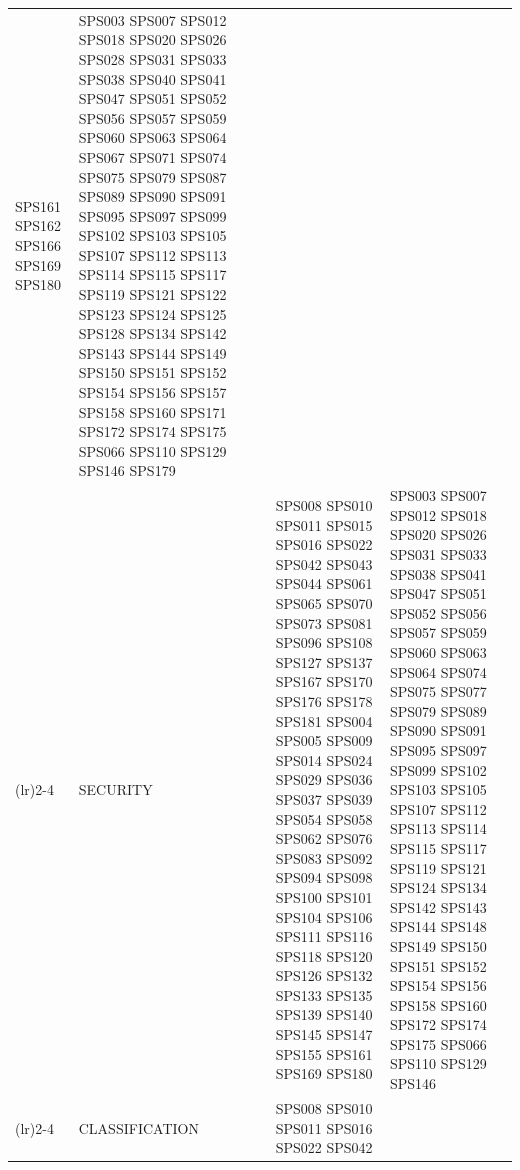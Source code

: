 \begin{table}[htbp]
\begin{tabularx}{\textwidth}{p{0.5cm}p{1.5cm}>{\raggedright\arraybackslash}X>{\raggedright\arraybackslash}X>{\raggedright\arraybackslash}X}
																		 SPS161 SPS162 SPS166 SPS169 SPS180         & SPS003 SPS007 SPS012 SPS018 SPS020 SPS026 
																													  SPS028 SPS031 SPS033 SPS038 SPS040 SPS041 
																													  SPS047 SPS051 SPS052 SPS056 SPS057 SPS059 
																													  SPS060 SPS063 SPS064 SPS067 SPS071 SPS074 
																													  SPS075 SPS079 SPS087 SPS089 SPS090 SPS091 
																													  SPS095 SPS097 SPS099 SPS102 SPS103 SPS105 
																													  SPS107 SPS112 SPS113 SPS114 SPS115 SPS117 
																													  SPS119 SPS121 SPS122 SPS123 SPS124 SPS125 
																													  SPS128 SPS134 SPS142 SPS143 SPS144 SPS149 
																													  SPS150 SPS151 SPS152 SPS154 SPS156 SPS157 
																													  SPS158 SPS160 SPS171 SPS172 SPS174 SPS175	
																													  SPS066 SPS110 SPS129 SPS146 SPS179         \\
		\addlinespace[0.3em]
		\cmidrule(lr){2-4}
											  & SECURITY            	& SPS008 SPS010 SPS011 SPS015 SPS016 SPS022 
																		  SPS042 SPS043 SPS044 SPS061 SPS065 SPS070 
																		  SPS073 SPS081 SPS096 SPS108 SPS127 SPS137 
																		  SPS167 SPS170 SPS176 SPS178 SPS181 SPS004 
																		  SPS005 SPS009 SPS014 SPS024 SPS029 SPS036 
																		  SPS037 SPS039 SPS054 SPS058 SPS062 SPS076 
																		  SPS083 SPS092 SPS094 SPS098 SPS100 SPS101 
																		  SPS104 SPS106 SPS111 SPS116 SPS118 SPS120 
																		  SPS126 SPS132 SPS133 SPS135 SPS139 SPS140 
																		  SPS145 SPS147 SPS155 SPS161 SPS169 SPS180  & SPS003 SPS007 SPS012 SPS018 SPS020 SPS026 
																													   SPS031 SPS033 SPS038 SPS041 SPS047 SPS051 
																													   SPS052 SPS056 SPS057 SPS059 SPS060 SPS063 
																													   SPS064 SPS074 SPS075 SPS077 SPS079 SPS089 
																													   SPS090 SPS091 SPS095 SPS097 SPS099 SPS102 
																													   SPS103 SPS105 SPS107 SPS112 SPS113 SPS114 
																													   SPS115 SPS117 SPS119 SPS121 SPS124 SPS134 
																													   SPS142 SPS143 SPS144 SPS148 SPS149 SPS150 
																													   SPS151 SPS152 SPS154 SPS156 SPS158 SPS160 
																													   SPS172 SPS174 SPS175 SPS066 SPS110 SPS129 
																													   SPS146                                     \\
		\addlinespace[0.3em]
		\cmidrule(lr){2-4}
											  & CLASSIFICATION          & SPS008 SPS010 SPS011 SPS016 SPS022 SPS042 

\end{tabularx}
\end{table}

